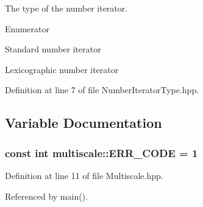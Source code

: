 The type of the number iterator. 

\begin{Desc}
\item[Enumerator]\par
\begin{description}
\item[{\em 
\hypertarget{namespacemultiscale_a6ef911f4d48a4bf5e657c237ec169ff5aa048887eb0360a4b70dff5452133f42e}{S\-T\-A\-N\-D\-A\-R\-D}\label{namespacemultiscale_a6ef911f4d48a4bf5e657c237ec169ff5aa048887eb0360a4b70dff5452133f42e}
}]Standard number iterator \item[{\em 
\hypertarget{namespacemultiscale_a6ef911f4d48a4bf5e657c237ec169ff5a2cba3a0174cc5c1d555ee13dcf6cda15}{L\-E\-X\-I\-C\-O\-G\-R\-A\-P\-H\-I\-C}\label{namespacemultiscale_a6ef911f4d48a4bf5e657c237ec169ff5a2cba3a0174cc5c1d555ee13dcf6cda15}
}]Lexicographic number iterator \end{description}
\end{Desc}


Definition at line 7 of file Number\-Iterator\-Type.\-hpp.



\subsection{Variable Documentation}
\hypertarget{namespacemultiscale_a4ee40795105048ee371efeeb7962ecf6}{
\subsubsection[{E\-R\-R\-\_\-\-C\-O\-D\-E}]{\setlength{\rightskip}{0pt plus 5cm}const int multiscale\-::\-E\-R\-R\-\_\-\-C\-O\-D\-E = 1}}\label{namespacemultiscale_a4ee40795105048ee371efeeb7962ecf6}


Definition at line 11 of file Multiscale.\-hpp.



Referenced by main().

